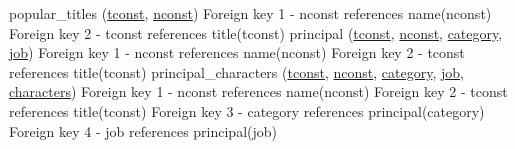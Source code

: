 \documentclass{sig-alternate}
\begin{document}
	popular\_titles (\underline{tconst}, \underline{nconst}) \newline
	Foreign key 1 - nconst references name(nconst) \newline
	Foreign key 2 - tconst references title(tconst) \newline
	principal (\underline{tconst}, \underline{nconst}, \underline{category}, \underline{job}) \newline
	Foreign key 1 - nconst references name(nconst) \newline
	Foreign key 2 - tconst references title(tconst) \newline
	principal\_characters (\underline{tconst}, \underline{nconst}, \underline{category}, \underline{job}, \underline{characters}) \newline
	Foreign key 1 - nconst references name(nconst) \newline
	Foreign key 2 - tconst references title(tconst) \newline
	Foreign key 3 - category references principal(category) \newline
	Foreign key 4 - job references principal(job) \newline
\end{document}
